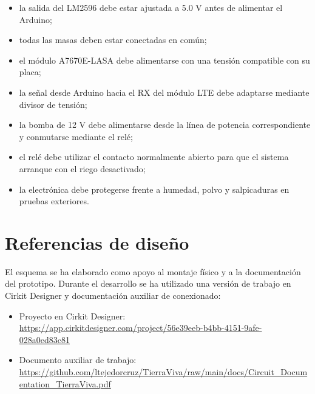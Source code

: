 \begin{itemize}
    \item la salida del LM2596 debe estar ajustada a 5.0 V antes de alimentar el Arduino;
    \item todas las masas deben estar conectadas en común;
    \item el módulo A7670E-LASA debe alimentarse con una tensión compatible con su placa;
    \item la señal desde Arduino hacia el RX del módulo LTE debe adaptarse mediante divisor de tensión;
    \item la bomba de 12 V debe alimentarse desde la línea de potencia correspondiente y conmutarse mediante el relé;
    \item el relé debe utilizar el contacto normalmente abierto para que el sistema arranque con el riego desactivado;
    \item la electrónica debe protegerse frente a humedad, polvo y salpicaduras en pruebas exteriores.
\end{itemize}

\section{Referencias de diseño}

El esquema se ha elaborado como apoyo al montaje físico y a la documentación del prototipo. Durante el desarrollo se ha utilizado una versión de trabajo en Cirkit Designer y documentación auxiliar de conexionado:

\begin{itemize}
    \item Proyecto en Cirkit Designer: \url{https://app.cirkitdesigner.com/project/56e39eeb-b4bb-4151-9afe-028a0ed83c81}
    \item Documento auxiliar de trabajo: \url{https://github.com/ltejedorcruz/TierraViva/raw/main/docs/Circuit_Documentation_TierraViva.pdf}
\end{itemize}
